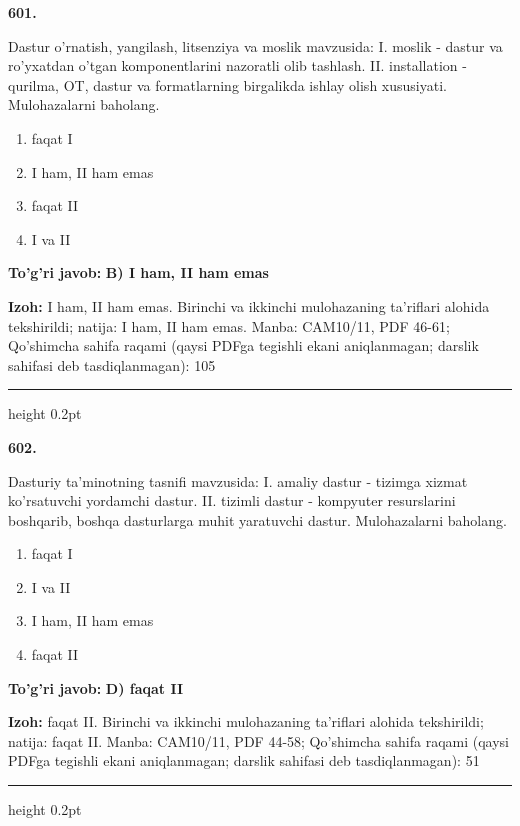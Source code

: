 \documentclass[10pt,a4paper]{article}
\begin{document}
{\bfseries\sffamily\color{ink} 601.}
\par
Dastur o'rnatish, yangilash, litsenziya va moslik mavzusida: I. moslik - dastur va ro'yxatdan o'tgan komponentlarini nazoratli olib tashlash. II. installation - qurilma, OT, dastur va formatlarning birgalikda ishlay olish xususiyati. Mulohazalarni baholang.
\begin{enumerate}[label=\Alph*),leftmargin=9mm]
\item faqat I
\item I ham, II ham emas
\item faqat II
\item I va II
\end{enumerate}
\begin{tcolorbox}[enhanced,breakable,colback=teal!4,colframe=teal!60!black,boxrule=0.45pt,arc=1.2mm,left=2.7mm,right=2.7mm,top=1.8mm,bottom=1.8mm,before skip=2mm,after skip=2mm]
{\bfseries\sffamily\color{teal}To'g'ri javob:} \textbf{B) I ham, II ham emas}
\par\smallskip
{\bfseries Izoh:} I ham, II ham emas. Birinchi va ikkinchi mulohazaning ta'riflari alohida tekshirildi; natija: I ham, II ham emas. Manba: CAM10/11, PDF 46-61; Qo'shimcha sahifa raqami (qaysi PDFga tegishli ekani aniqlanmagan; darslik sahifasi deb tasdiqlanmagan): 105
\end{tcolorbox}
\vspace{2mm}\hrule height 0.2pt\vspace{3mm}

{\bfseries\sffamily\color{ink} 602.}
\par
Dasturiy ta'minotning tasnifi mavzusida: I. amaliy dastur - tizimga xizmat ko'rsatuvchi yordamchi dastur. II. tizimli dastur - kompyuter resurslarini boshqarib, boshqa dasturlarga muhit yaratuvchi dastur. Mulohazalarni baholang.
\begin{enumerate}[label=\Alph*),leftmargin=9mm]
\item faqat I
\item I va II
\item I ham, II ham emas
\item faqat II
\end{enumerate}
\begin{tcolorbox}[enhanced,breakable,colback=teal!4,colframe=teal!60!black,boxrule=0.45pt,arc=1.2mm,left=2.7mm,right=2.7mm,top=1.8mm,bottom=1.8mm,before skip=2mm,after skip=2mm]
{\bfseries\sffamily\color{teal}To'g'ri javob:} \textbf{D) faqat II}
\par\smallskip
{\bfseries Izoh:} faqat II. Birinchi va ikkinchi mulohazaning ta'riflari alohida tekshirildi; natija: faqat II. Manba: CAM10/11, PDF 44-58; Qo'shimcha sahifa raqami (qaysi PDFga tegishli ekani aniqlanmagan; darslik sahifasi deb tasdiqlanmagan): 51
\end{tcolorbox}
\vspace{2mm}\hrule height 0.2pt\vspace{3mm}
\end{document}
